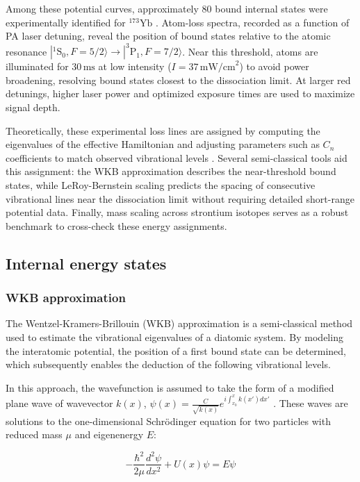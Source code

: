 Among these potential curves, approximately 80 bound internal states were experimentally identified for $^{173}\text{Yb}$ \cite{han_photoassociation_2018}. Atom-loss spectra, recorded as a function of PA laser 
detuning, reveal the position of bound states relative to the atomic resonance $|^1\text{S}_0, F=5/2\rangle \to |^3\text{P}_1, F=7/2\rangle$. Near this threshold, atoms are illuminated for $30\,\text{ms}$ at low 
intensity ($I = 37\,\text{mW/cm}^2$) to avoid power broadening, resolving bound states closest to the dissociation limit. At larger red detunings, higher laser power and optimized exposure times are used to maximize
 signal depth.

Theoretically, these experimental loss lines are assigned by computing the eigenvalues of the effective Hamiltonian and adjusting parameters such as $C_n$ coefficients to match observed vibrational levels 
\cite{borkowski_line_2009}. Several semi-classical tools aid this assignment: the WKB approximation describes the near-threshold bound states, while LeRoy-Bernstein scaling predicts the spacing of consecutive 
vibrational lines near the dissociation limit without requiring detailed short-range potential data. Finally, mass scaling across strontium isotopes \cite{borkowski_mass_2014} serves as a robust benchmark to 
cross-check these energy assignments.


\subsection{Internal energy states}
\subsubsection{WKB approximation}

The Wentzel-Kramers-Brillouin (WKB) approximation is a semi-classical method used to estimate the 
vibrational eigenvalues of a diatomic system. By modeling the interatomic potential, the position 
of a first bound state can be determined, which subsequently enables the deduction of the following 
vibrational levels.

In this approach, the wavefunction is assumed to take the form of a modified plane wave of wavevector $k(x)$,
$\psi(x) = \frac{C}{\sqrt{k(x)}}e^{i\int_{x_0}^{x} k(x') dx'}$ \cite{sakurai2020modern}. These waves are solutions 
to the one-dimensional Schrödinger equation for two particles with reduced mass $\mu$ and 
eigenenergy $E$:

\begin{equation}
    -\frac{\hbar^2}{2\mu}\frac{d^2\psi}{dx^2} + U(x)\psi = E\psi
    \label{eq:schrodinger_1d}
\end{equation}

